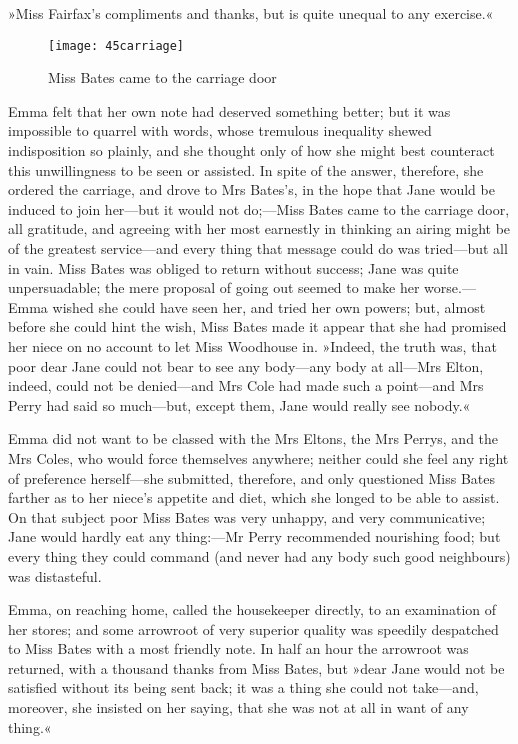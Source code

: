 »Miss Fairfax's compliments and thanks, but is quite unequal to any exercise.«

\begin{figure}[tbph]
\centering
\texttt{[image: 45carriage]}
\caption{Miss Bates came to the carriage door}
\end{figure}

Emma felt that her own note had deserved something better; but it was impossible to quarrel with words, whose tremulous inequality shewed indisposition so plainly, and she thought only of how she might best counteract this unwillingness to be seen or assisted. In spite of the answer, therefore, she ordered the carriage, and drove to Mrs Bates's, in the hope that Jane would be induced to join her—but it would not do;—Miss Bates came to the carriage door, all gratitude, and agreeing with her most earnestly in thinking an airing might be of the greatest service—and every thing that message could do was tried—but all in vain. Miss Bates was obliged to return without success; Jane was quite unpersuadable; the mere proposal of going out seemed to make her worse.—Emma wished she could have seen her, and tried her own powers; but, almost before she could hint the wish, Miss Bates made it appear that she had promised her niece on no account to let Miss Woodhouse in. »Indeed, the truth was, that poor dear Jane could not bear to see any body—any body at all—Mrs Elton, indeed, could not be denied—and Mrs Cole had made such a point—and Mrs Perry had said so much—but, except them, Jane would really see nobody.«

Emma did not want to be classed with the Mrs Eltons, the Mrs Perrys, and the Mrs Coles, who would force themselves anywhere; neither could she feel any right of preference herself—she submitted, therefore, and only questioned Miss Bates farther as to her niece's appetite and diet, which she longed to be able to assist. On that subject poor Miss Bates was very unhappy, and very communicative; Jane would hardly eat any thing:—Mr Perry recommended nourishing food; but every thing they could command (and never had any body such good neighbours) was distasteful.

Emma, on reaching home, called the housekeeper directly, to an examination of her stores; and some arrowroot of very superior quality was speedily despatched to Miss Bates with a most friendly note. In half an hour the arrowroot was returned, with a thousand thanks from Miss Bates, but »dear Jane would not be satisfied without its being sent back; it was a thing she could not take—and, moreover, she insisted on her saying, that she was not at all in want of any thing.«

